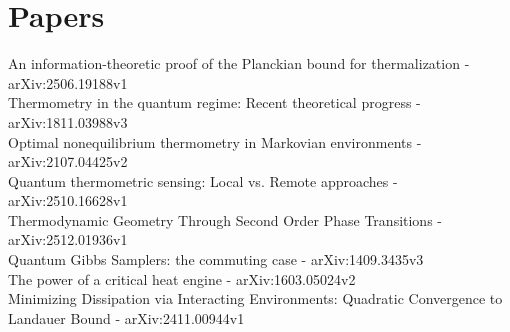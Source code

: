 \documentclass{article}
\begin{document}
\newpage
\section*{Papers}

An information-theoretic proof of the Planckian bound for thermalization -  arXiv:2506.19188v1 \\

Thermometry in the quantum regime: Recent theoretical progress - arXiv:1811.03988v3 \\

Optimal nonequilibrium thermometry in Markovian environments - arXiv:2107.04425v2\\

Quantum thermometric sensing: Local vs. Remote approaches - arXiv:2510.16628v1\\

Thermodynamic Geometry Through Second Order Phase Transitions - arXiv:2512.01936v1\\

Quantum Gibbs Samplers: the commuting case - arXiv:1409.3435v3\\

The power of a critical heat engine - arXiv:1603.05024v2\\

Minimizing Dissipation via Interacting Environments: Quadratic Convergence to Landauer Bound - arXiv:2411.00944v1\\
\end{document}
